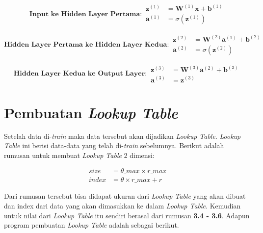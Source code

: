 \begin{equation}
  \textbf{Input ke Hidden Layer Pertama}:
  \begin{aligned}
    \mathbf{z}^{(1)} &= \mathbf{W}^{(1)} \mathbf{x} + \mathbf{b}^{(1)} \\
    \mathbf{a}^{(1)} &= \sigma(\mathbf{z}^{(1)})
  \end{aligned}
\end{equation}

\begin{equation}
  \textbf{Hidden Layer Pertama ke Hidden Layer Kedua}:
  \begin{aligned}
    \mathbf{z}^{(2)} &= \mathbf{W}^{(2)} \mathbf{a}^{(1)} + \mathbf{b}^{(2)} \\
    \mathbf{a}^{(2)} &= \sigma(\mathbf{z}^{(2)})
  \end{aligned}
\end{equation}

\begin{equation}
  \textbf{Hidden Layer Kedua ke Output Layer}:
  \begin{aligned}
    \mathbf{z}^{(3)} &= \mathbf{W}^{(3)} \mathbf{a}^{(2)} + \mathbf{b}^{(3)} \\
    \mathbf{a}^{(3)} &= \mathbf{z}^{(3)}
  \end{aligned}
\end{equation}



\section{Pembuatan \textit{Lookup Table}
  \label{sec:pembuatanlut}}

Setelah data di-\textit{train} maka data tersebut akan dijadikan \textit{Lookup Table}. \textit{Lookup Table} ini berisi data-data yang telah di-\textit{train} sebelumnya. Berikut adalah rumusan untuk membuat \textit{Lookup Table} 2 dimensi: 

\begin{equation}
  \begin{aligned}
    size &= \theta\_max \times r\_max \\
    index &= \theta \times r\_max + r
  \end{aligned}
\end{equation}

Dari rumusan tersebut bisa didapat ukuran dari \textit{Lookup Table} yang akan dibuat dan index dari data yang akan dimasukkan ke dalam \textit{Lookup Table}.
Kemudian untuk nilai dari \textit{Lookup Table} itu sendiri berasal dari rumusan \textbf{3.4 - 3.6}.
Adapun program pembuatan \textit{Lookup Table} adalah sebagai berikut.

